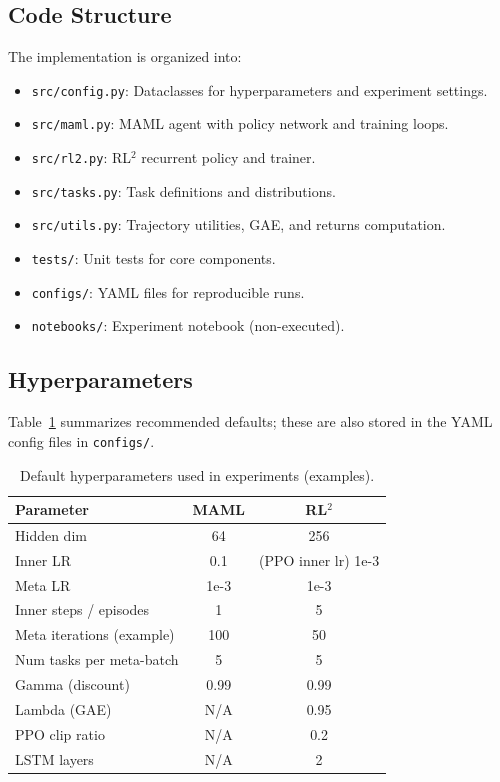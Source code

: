\documentclass[11pt,a4paper]{article}
\begin{document}
\subsection{Code Structure}
The implementation is organized into:
\begin{itemize}
  \item \texttt{src/config.py}: Dataclasses for hyperparameters and experiment settings.
  \item \texttt{src/maml.py}: MAML agent with policy network and training loops.
  \item \texttt{src/rl2.py}: RL$^2$ recurrent policy and trainer.
  \item \texttt{src/tasks.py}: Task definitions and distributions.
  \item \texttt{src/utils.py}: Trajectory utilities, GAE, and returns computation.
  \item \texttt{tests/}: Unit tests for core components.
  \item \texttt{configs/}: YAML files for reproducible runs.
  \item \texttt{notebooks/}: Experiment notebook (non-executed).
\end{itemize}

\subsection{Hyperparameters}
Table~\ref{tab:hyper} summarizes recommended defaults; these are also stored in the YAML config files in \texttt{configs/}.

\begin{table}[H]
\centering
\caption{Default hyperparameters used in experiments (examples).}
\label{tab:hyper}
\begin{tabular}{lcc}
\toprule
Parameter & MAML & RL$^2$ \\
\midrule
Hidden dim & 64 & 256 \\
Inner LR & 0.1 & (PPO inner lr) 1e-3 \\
Meta LR & 1e-3 & 1e-3 \\
Inner steps / episodes & 1 & 5 \\
Meta iterations (example) & 100 & 50 \\
Num tasks per meta-batch & 5 & 5 \\
Gamma (discount) & 0.99 & 0.99 \\
Lambda (GAE) & N/A & 0.95 \\
PPO clip ratio & N/A & 0.2 \\
LSTM layers & N/A & 2 \\
\bottomrule
\end{tabular}
\end{table}
\end{document}
